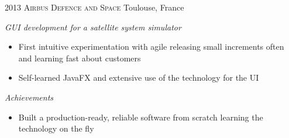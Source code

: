 \documentclass[]{friggeri-cv} %
\begin{document}
\begin{entrylist}
\entry
{2013}
{\textsc{Airbus Defence and Space}}
{Toulouse, France}
{\emph{GUI development for a satellite system simulator}
\begin{itemize}
\item First intuitive experimentation with agile releasing small increments often and learning fast about customers
\item Self-learned JavaFX and extensive use of the technology for the UI
\end{itemize}
\emph{Achievements}
\begin{itemize}
\item Built a production-ready, reliable software from scratch learning the technology on the fly
\end{itemize}
}


\end{entrylist}
\end{document}
